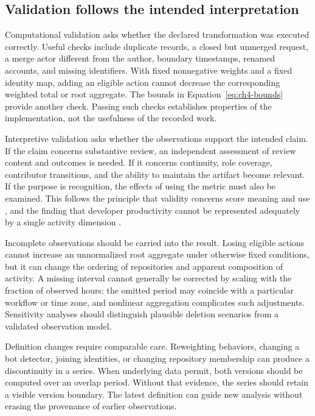 \subsection{Validation follows the intended interpretation}
Computational validation asks whether the declared transformation was executed correctly. Useful checks include duplicate records, a closed but unmerged request, a merge actor different from the author, boundary timestamps, renamed accounts, and missing identifiers. With fixed nonnegative weights and a fixed identity map, adding an eligible action cannot decrease the corresponding weighted total or root aggregate. The bounds in Equation~\ref{eq:ch4-bounds} provide another check. Passing such checks establishes properties of the implementation, not the usefulness of the recorded work.

Interpretive validation asks whether the observations support the intended claim. If the claim concerns substantive review, an independent assessment of review content and outcomes is needed. If it concerns continuity, role coverage, contributor transitions, and the ability to maintain the artifact become relevant. If the purpose is recognition, the effects of using the metric must also be examined. This follows the principle that validity concerns score meaning and use \citep{messick1995}, and the finding that developer productivity cannot be represented adequately by a single activity dimension \citep{forsgren2021}.

Incomplete observations should be carried into the result. Losing eligible actions cannot increase an unnormalized root aggregate under otherwise fixed conditions, but it can change the ordering of repositories and apparent composition of activity. A missing interval cannot generally be corrected by scaling with the fraction of observed hours: the omitted period may coincide with a particular workflow or time zone, and nonlinear aggregation complicates such adjustments. Sensitivity analyses should distinguish plausible deletion scenarios from a validated observation model.

Definition changes require comparable care. Reweighting behaviors, changing a bot detector, joining identities, or changing repository membership can produce a discontinuity in a series. When underlying data permit, both versions should be computed over an overlap period. Without that evidence, the series should retain a visible version boundary. The latest definition can guide new analysis without erasing the provenance of earlier observations.

